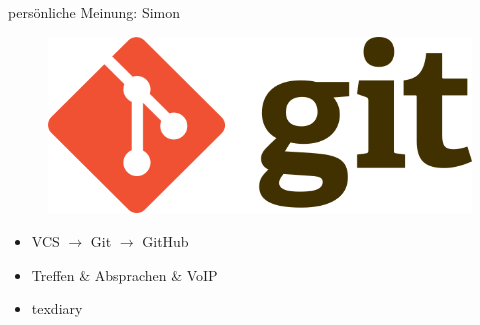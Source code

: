 \documentclass[aspectratio=169]{beamer}
\begin{document}
\begin{frame}{persönliche Meinung: Simon}
    \begin{varwidth}{.4\textwidth}
        \begin{figure}
            \centering
            \includegraphics[width=.95\textwidth]{media/git-logo.png}
        \end{figure}
    \end{varwidth}
    \hfill
    \begin{varwidth}{.5\textwidth}
        \begin{itemize}\pause
            \item VCS $\rightarrow$ Git $\rightarrow$ GitHub\pause
            \item Treffen \& Absprachen \& VoIP\pause
            \item texdiary
        \end{itemize}
    \end{varwidth}
\end{frame}
\end{document}
